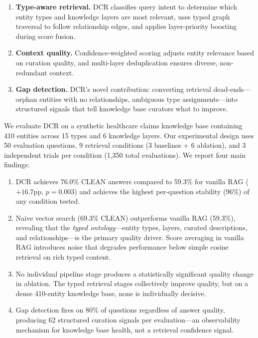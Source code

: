 \documentclass[11pt,a4paper]{article}
\begin{document}
\begin{enumerate}[nosep]
  \item \textbf{Type-aware retrieval.} DCR classifies query intent to determine which entity types and knowledge layers are most relevant, uses typed graph traversal to follow relationship edges, and applies layer-priority boosting during score fusion.
  \item \textbf{Context quality.} Confidence-weighted scoring adjusts entity relevance based on curation quality, and multi-layer deduplication ensures diverse, non-redundant context.
  \item \textbf{Gap detection.} DCR's novel contribution: converting retrieval dead-ends---orphan entities with no relationships, ambiguous type assignments---into structured signals that tell knowledge base curators what to improve.
\end{enumerate}

We evaluate DCR on a synthetic healthcare claims knowledge base containing 410 entities across 15 types and 6 knowledge layers. Our experimental design uses 50 evaluation questions, 9 retrieval conditions (3 baselines + 6 ablation), and 3 independent trials per condition (1,350 total evaluations). We report four main findings:

\begin{enumerate}[nosep]
  \item DCR achieves 76.0\% CLEAN answers compared to 59.3\% for vanilla RAG ($+16.7$pp, $p = 0.003$) and achieves the highest per-question stability (96\%) of any condition tested.
  \item Naive vector search (69.3\% CLEAN) outperforms vanilla RAG (59.3\%), revealing that the \emph{typed ontology}---entity types, layers, curated descriptions, and relationships---is the primary quality driver. Score averaging in vanilla RAG introduces noise that degrades performance below simple cosine retrieval on rich typed content.
  \item No individual pipeline stage produces a statistically significant quality change in ablation. The typed retrieval stages collectively improve quality, but on a dense 410-entity knowledge base, none is individually decisive.
  \item Gap detection fires on 80\% of questions regardless of answer quality, producing 62 structured curation signals per evaluation---an observability mechanism for knowledge base health, not a retrieval confidence signal.
\end{enumerate}
\end{document}
